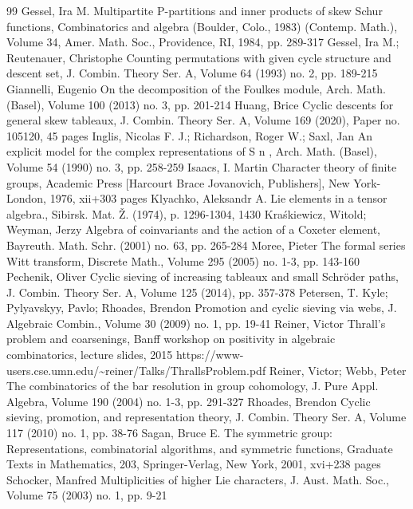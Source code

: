 \documentclass[10pt]{article}
\theoremstyle{definition}
\begin{document}
\begin{thebibliography}{99}
Gessel, Ira M. Multipartite P-partitions and inner products of skew Schur functions, Combinatorics and algebra (Boulder, Colo., 1983) (Contemp. Math.), Volume 34, Amer. Math. Soc., Providence, RI, 1984, pp. 289-317
Gessel, Ira M.; Reutenauer, Christophe Counting permutations with given cycle structure and descent set, J. Combin. Theory Ser. A, Volume 64 (1993) no. 2, pp. 189-215
Giannelli, Eugenio On the decomposition of the Foulkes module, Arch. Math. (Basel), Volume 100 (2013) no. 3, pp. 201-214
Huang, Brice Cyclic descents for general skew tableaux, J. Combin. Theory Ser. A, Volume 169 (2020), Paper no. 105120, 45 pages
Inglis, Nicolas F. J.; Richardson, Roger W.; Saxl, Jan An explicit model for the complex representations of S n , Arch. Math. (Basel), Volume 54 (1990) no. 3, pp. 258-259
Isaacs, I. Martin Character theory of finite groups, Academic Press [Harcourt Brace Jovanovich, Publishers], New York-London, 1976, xii+303 pages
Klyachko, Aleksandr A. Lie elements in a tensor algebra., Sibirsk. Mat. Ž. (1974), p. 1296-1304, 1430
Kraśkiewicz, Witold; Weyman, Jerzy Algebra of coinvariants and the action of a Coxeter element, Bayreuth. Math. Schr. (2001) no. 63, pp. 265-284
Moree, Pieter The formal series Witt transform, Discrete Math., Volume 295 (2005) no. 1-3, pp. 143-160
Pechenik, Oliver Cyclic sieving of increasing tableaux and small Schröder paths, J. Combin. Theory Ser. A, Volume 125 (2014), pp. 357-378
Petersen, T. Kyle; Pylyavskyy, Pavlo; Rhoades, Brendon Promotion and cyclic sieving via webs, J. Algebraic Combin., Volume 30 (2009) no. 1, pp. 19-41
Reiner, Victor Thrall’s problem and coarsenings, Banff workshop on positivity in algebraic combinatorics, lecture slides, 2015 https://www-users.cse.umn.edu/\textasciitilde{}reiner/Talks/ThrallsProblem.pdf
Reiner, Victor; Webb, Peter The combinatorics of the bar resolution in group cohomology, J. Pure Appl. Algebra, Volume 190 (2004) no. 1-3, pp. 291-327
Rhoades, Brendon Cyclic sieving, promotion, and representation theory, J. Combin. Theory Ser. A, Volume 117 (2010) no. 1, pp. 38-76
Sagan, Bruce E. The symmetric group: Representations, combinatorial algorithms, and symmetric functions, Graduate Texts in Mathematics, 203, Springer-Verlag, New York, 2001, xvi+238 pages
Schocker, Manfred Multiplicities of higher Lie characters, J. Aust. Math. Soc., Volume 75 (2003) no. 1, pp. 9-21

\end{thebibliography}
\end{document}
